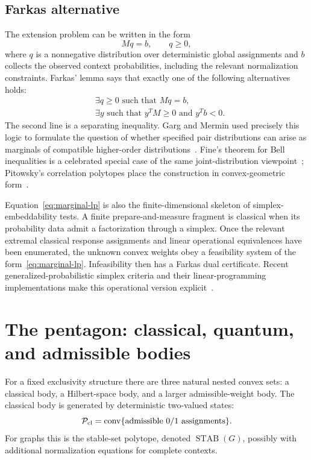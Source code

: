 \documentclass[aps,pra,reprint,superscriptaddress,nofootinbib,floatfix]{revtex4-2}
\newcommand{\conv}{\operatorname{conv}}
\newcommand{\STAB}{\operatorname{STAB}}
\begin{document}
\subsection{Farkas alternative}

The extension problem can be written in the form
\begin{equation}
        Mq=b,\qquad q\ge 0,
        \label{eq:marginal-lp}
\end{equation}
where \(q\) is a nonnegative distribution over deterministic global
assignments and \(b\) collects the observed context probabilities, including
the relevant normalization constraints.  Farkas' lemma says that exactly one
of the following alternatives holds:
\begin{align}
&\exists q\ge 0 \text{ such that } Mq=b,                         \\
&\exists y \text{ such that } y^TM\ge 0 \text{ and } y^Tb<0 .
        \label{eq:farkas}
\end{align}
The second line is a separating inequality.  Garg and Mermin used precisely
this logic to formulate the question of whether specified pair distributions
can arise as marginals of compatible higher-order
distributions~\cite{Garg1984}.  Fine's theorem for Bell inequalities is a
celebrated special case of the same joint-distribution
viewpoint~\cite{Fine-82}; Pitowsky's correlation polytopes place the
construction in convex-geometric form~\cite{pitowsky-86}.

Equation~\eqref{eq:marginal-lp} is also the finite-dimensional skeleton of
simplex-embeddability tests.  A finite prepare-and-measure fragment is
classical when its probability data admit a factorization through a simplex.
Once the relevant extremal classical response assignments and linear
operational equivalences have been enumerated, the unknown convex weights
obey a feasibility system of the form~\eqref{eq:marginal-lp}.  Infeasibility
then has a Farkas dual certificate.  Recent generalized-probabilistic simplex
criteria and their linear-programming implementations make this operational
version explicit~\cite{schmid-2021-simplex,selby-2024-lp}.

\section{The pentagon: classical, quantum, and admissible bodies}

For a fixed exclusivity structure there are three natural nested convex sets:
a classical body, a Hilbert-space body, and a larger admissible-weight body.
The classical body is generated by deterministic two-valued states:
\begin{equation}
        \mathcal P_{\rm cl}
        =
        \conv\{\text{admissible }0/1\text{ assignments}\}.
\end{equation}
For graphs this is the stable-set polytope, denoted \(\STAB(G)\), possibly
with additional normalization equations for complete contexts.
\end{document}
